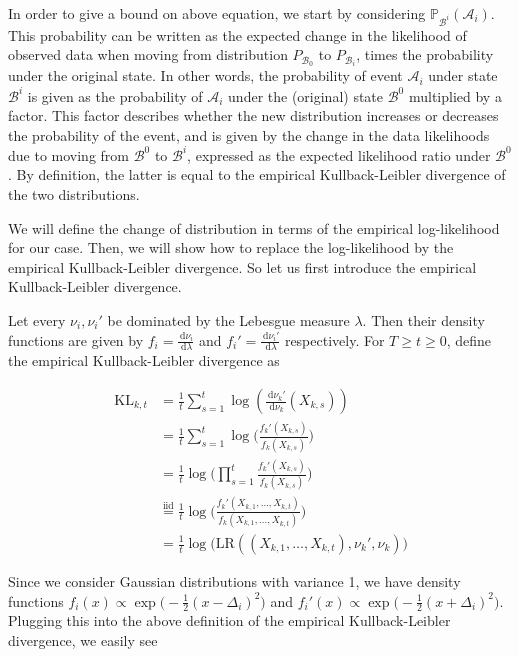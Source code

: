 \documentclass[12pt,]{article}
\newcommand{\KL}{\,\text{KL}}
\newcommand{\der}{\,\text{d}}
\begin{document}
In order to give a bound on above equation, we start by considering
\(\mathbb{P}_{\mathcal{B}^i}(\mathcal{A}_i)\). This probability can be
written as the expected change in the likelihood of observed data when
moving from distribution \(P_{\mathcal{B}_0}\) to \(P_{\mathcal{B}_i}\),
times the probability under the original state. In other words, the
probability of event \(\mathcal{A}_i\) under state \(\mathcal{B}^i\) is
given as the probability of \(\mathcal{A}_i\) under the (original) state
\(\mathcal{B}^0\) multiplied by a factor. This factor describes whether
the new distribution increases or decreases the probability of the
event, and is given by the change in the data likelihoods due to moving
from \(\mathcal{B}^0\) to \(\mathcal{B}^i\), expressed as the expected
likelihood ratio under \(\mathcal{B}^0\). By definition, the latter is
equal to the empirical Kullback-Leibler divergence of the two
distributions.

We will define the change of distribution in terms of the empirical
log-likelihood for our case. Then, we will show how to replace the
log-likelihood by the empirical Kullback-Leibler divergence. So let us
first introduce the empirical Kullback-Leibler divergence.

Let every \(\nu_i, \nu_i'\) be dominated by the Lebesgue measure
\(\lambda\). Then their density functions are given by
\(f_i = \frac{\der \nu_i}{\der \lambda}\) and
\(f_i' = \frac{\der \nu_i'}{\der \lambda}\) respectively. For
\(T \geq t \geq 0\), define the empirical Kullback-Leibler divergence as

\begin{align*}
\hat{\KL}_{k,t} & = \frac{1}{t} \sum_{s=1}^{t} \log(\frac{\der \nu_k'}{\der \nu_k}(X_{k,s})) \\
& = \frac{1}{t} \sum_{s=1}^{t} \log \big(\frac{f_k'(X_{k,s})}{f_k(X_{k,s})} \big) \\
& = \frac{1}{t} \log \big( \prod_{s=1}^{t} \frac{f_k'(X_{k,s})}{f_k(X_{k,s})} \big) \\
& \stackrel{\text{iid}}{=} \frac{1}{t} \log \big( \frac{f_k'(X_{k,1}, \dots,X_{k,t})}{f_k(X_{k,1}, \dots,X_{k,t})} \big) \\
& = \frac{1}{t} \log \big( \text{LR}((X_{k,1}, \dots,X_{k,t}), \nu_k', \nu_k) \big)
\end{align*}

Since we consider Gaussian distributions with variance 1, we have
density functions
\(f_i(x) \propto \exp \big(-\frac{1}{2} (x-\Delta_i)^2\big)\) and
\(f_i'(x) \propto \exp \big(-\frac{1}{2} (x+\Delta_i)^2\big)\). Plugging
this into the above definition of the empirical Kullback-Leibler
divergence, we easily see
\end{document}
